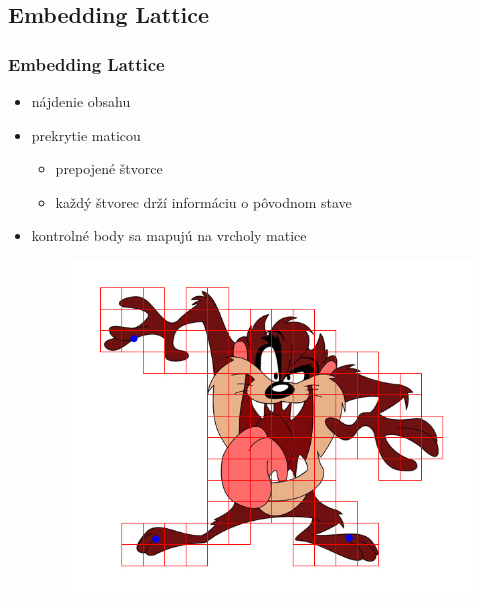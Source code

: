 \documentclass[a4paper]{beamer}
\begin{document}
\subsection{Embedding Lattice}
\begin{frame}	
	\frametitle{Embedding Lattice}
	\begin{itemize}
		\item nájdenie obsahu
		\item prekrytie maticou
		\begin{itemize}
			\item prepojené štvorce
			\item každý štvorec drží informáciu o pôvodnom stave
		\end{itemize}
		\item kontrolné body sa mapujú na vrcholy matice

		\begin{figure}
			\centering
			\includegraphics[height=0.5\textheight,keepaspectratio]{pic/taz_initial.jpg}
		\end{figure}
	\end{itemize}
\end{frame}
\end{document}
